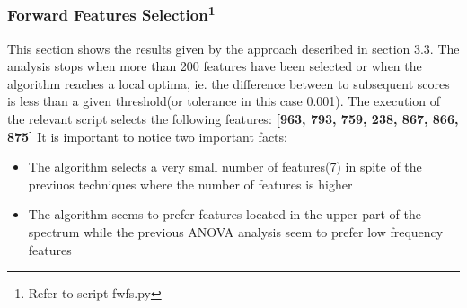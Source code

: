 \documentclass[a4paper,10pt]{article}
\begin{document}
     \subsubsection{Forward Features Selection\protect\footnote{Refer to script fwfs.py}}
      This section shows the results given by the approach described in section 3.3.
      The analysis stops when more than 200 features have been selected or when the algorithm reaches a local optima,
      ie. the difference between to subsequent scores is less than a given threshold(or tolerance in this case 0.001).\newline
      The execution of the relevant script selects the following features:\newline\newline
      \textbf{[963, 793, 759, 238, 867, 866, 875]}\newline\newline
      It is important to notice two important facts:
      \begin{itemize}
       \item The algorithm selects a very small number of features(7) in spite of the previuos techniques where the number of features 
	is higher
       \item The algorithm seems to prefer features located in the upper part of the spectrum while the previous ANOVA analysis 
	seem to prefer low frequency features
      \end{itemize}
      
\end{document}
